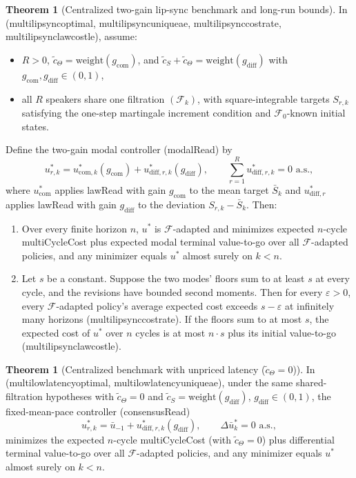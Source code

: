 \documentclass[11pt,a4paper]{article}
\DeclareRobustCommand{\lean}[1]{{\ttfamily\def\_{\textunderscore\allowbreak}#1}}
\theoremstyle{definition}
\newtheorem{theorem}[definition]{Theorem}
\begin{document}
\begin{theorem}[Centralized two-gain lip-sync benchmark and long-run bounds]
\label{thm:lipsync-opt}
In  (\lean{multi\_lipsync\_optimal},
\lean{multi\_lipsync\_unique\_ae}, \lean{multi\_lipsync\_cost\_rate},
\lean{multi\_lipsync\_law\_cost\_le}), assume:
\begin{itemize}
\item $R > 0$, $\tilde c_\Theta = \mathrm{weight}(g_{\mathrm{com}})$, and
  $\tilde c_S + \tilde c_\Theta = \mathrm{weight}(g_{\mathrm{diff}})$ with
  $g_{\mathrm{com}}, g_{\mathrm{diff}} \in (0, 1)$,
\item all $R$ speakers share one filtration $(\mathcal{F}_k)$, with
  square-integrable targets $S_{r,k}$ satisfying the one-step martingale
  increment condition and $\mathcal{F}_0$-known initial states.
\end{itemize}
Define the two-gain modal controller (\lean{modalRead}) by
\[
  u_{r,k}^* = u_{\mathrm{com},k}^*(g_{\mathrm{com}})
            + u_{\mathrm{diff},r,k}^*(g_{\mathrm{diff}}),
  \qquad \sum_{r=1}^R u_{\mathrm{diff},r,k}^* = 0\text{ a.s.},
\]
where $u_{\mathrm{com}}^*$ applies \lean{lawRead} with gain $g_{\mathrm{com}}$
to the mean target $\bar S_k$ and $u_{\mathrm{diff},r}^*$ applies
\lean{lawRead} with gain $g_{\mathrm{diff}}$ to the deviation $S_{r,k} - \bar S_k$.
Then:
\begin{enumerate}
\item Over every finite horizon $n$, $u^*$ is $\mathcal{F}$-adapted and
  minimizes expected $n$-cycle \lean{multiCycleCost} plus expected modal
  terminal value-to-go over all $\mathcal{F}$-adapted policies, and any
  minimizer equals $u^*$ almost surely on $k < n$.
\item Let $s$ be a constant. Suppose the two modes' floors sum to at least $s$
  at every cycle, and the revisions have bounded second moments. Then for every
  $\varepsilon > 0$, every $\mathcal{F}$-adapted policy's average expected cost
  exceeds $s - \varepsilon$ at infinitely many horizons
  (\lean{multi\_lipsync\_cost\_rate}). If the floors sum to at most $s$, the
  expected cost of $u^*$ over $n$ cycles is at most $n \cdot s$ plus its
  initial value-to-go (\lean{multi\_lipsync\_law\_cost\_le}).
\end{enumerate}
\end{theorem}

\begin{theorem}[Centralized benchmark with unpriced latency ($\tilde c_\Theta = 0$)]
\label{thm:lowlat-opt}
In  (\lean{multi\_lowlatency\_optimal},
\lean{multi\_lowlatency\_unique\_ae}), under the same shared-filtration
hypotheses with $\tilde c_\Theta = 0$ and $\tilde c_S = \mathrm{weight}(g_{\mathrm{diff}})$,
$g_{\mathrm{diff}} \in (0, 1)$, the fixed-mean-pace controller
(\lean{consensusRead})
\[
  u_{r,k}^* = \bar u_{-1} + u_{\mathrm{diff},r,k}^*(g_{\mathrm{diff}}),
  \qquad \Delta \bar u_k^* = 0\text{ a.s.},
\]
minimizes the expected $n$-cycle \lean{multiCycleCost} (with $\tilde c_\Theta = 0$)
plus differential terminal value-to-go over all $\mathcal{F}$-adapted policies,
and any minimizer equals $u^*$ almost surely on $k < n$.
\end{theorem}
\end{document}
